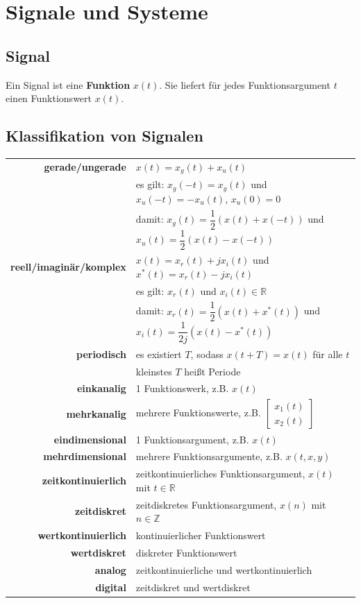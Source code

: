 \documentclass[10pt,a4paper]{article}
\author{Florian Euchner, Stefan Köbel, Chong Shen, Jan Frederik Dick}
\newcommand{\fancythumb}[2]{
	\addthumb{#1}{\large\sffamily\textbf{\space\space#1\vspace{5pt}}}{white}{#2}
}
\begin{document}
\section*{Signale und Systeme}
\fancythumb{S\&S}{teal}
\subsection*{Signal}
Ein Signal ist eine \textbf{Funktion} $x(t)$. Sie liefert für jedes Funktionsargument $t$ einen Funktionswert $x(t)$.
\subsection*{Klassifikation von Signalen}
\begin{tabular}{r p{12cm}}
	\textbf{gerade/ungerade} & $x(t)=x_g(t)+x_u(t)$\\
	 & es gilt: $x_g(-t)=x_g(t)$ und $x_u(-t)=-x_u(t)$, $x_u(0)=0$\\
	 & damit: $x_g(t)=\dfrac{1}{2}(x(t)+x(-t))$ und $x_u(t)=\dfrac{1}{2}(x(t)-x(-t))$\\
	 \textbf{reell/imaginär/komplex} & $x(t)=x_r(t)+jx_i(t)$ und $x^*(t)=x_r(t)-jx_i(t)$\\
	 & es gilt: $x_r(t)$ und $x_i(t) \in \mathbb R$\\
	 & damit: $x_r(t)=\dfrac{1}{2}(x(t)+x^*(t))$ und $x_i(t)=\dfrac{1}{2j}(x(t)-x^*(t))$\\
	 \textbf{periodisch} & es existiert $T$, sodass $x(t+T)=x(t)$ für alle $t$\\
	 & kleinstes $T$ heißt Periode\\
	 \textbf{einkanalig} & 1 Funktionswerk, z.B. $x(t)$\\
	 \textbf{mehrkanalig} & mehrere Funktionswerte, z.B.
	$\begin{bmatrix}
		x_1(t) \\ 
		x_2(t)
	\end{bmatrix}$\\
	\textbf{eindimensional} & 1 Funktionsargument, z.B. $x(t)$\\
	\textbf{mehrdimensional} & mehrere Funktionsargumente, z.B. $x(t,x,y)$\\
	\textbf{zeitkontinuierlich} & zeitkontinuierliches Funktionsargument, $x(t)$ mit $t \in \mathbb R$\\
	\textbf{zeitdiskret} & zeitdiskretes Funktionsargument, $x(n)$ mit $n \in \mathbb Z$\\
	\textbf{wertkontinuierlich} & kontinuierlicher Funktionswert\\
	\textbf{wertdiskret} & diskreter Funktionswert\\
	\textbf{analog} & zeitkontinuierliche und wertkontinuierlich\\
	\textbf{digital} & zeitdiskret und wertdiskret\\
\end{tabular}
\end{document}
